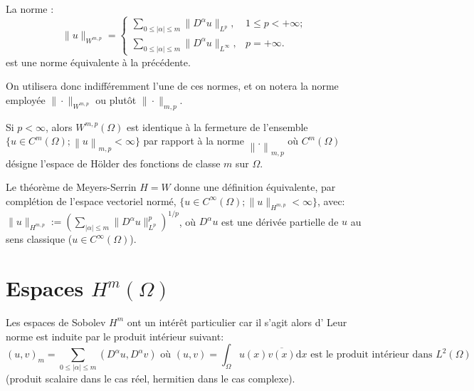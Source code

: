 \medskip
La norme :
\begin{equation}
\| u \|_{W^{m, p}} = \begin{cases} \sum\limits _{0\leqslant | \alpha | \leqslant m} \| D^{\alpha} u \|_{L^{p}}, & 1 \leqslant p < + \infty; \\ \sum\limits _{0 \leqslant | \alpha | \leqslant m} \| D^{\alpha} u \|_{L^{\infty}}, & p = + \infty. \end{cases} \end{equation}
est une norme équivalente à la précédente.

On utilisera donc indifféremment l'une de ces normes, et on notera la norme
employée $\|\cdot\|_{W^{m, p}}$ ou plutôt $\|\cdot\|_{m, p}$.


\medskip{}
Si $p<\infty$, alors $W^{m,p}(\Omega)$ est identique à la fermeture de l'ensemble
$\lbrace u \in C^m(\Omega) ; \left\|u \right\|_{m,p} < \infty \rbrace$ par rapport à la norme
$\left\| . \right\|_{m,p}$ où $C^m(\Omega)$ désigne l'espace de H\"older des fonctions de
classe $m$ sur $\Omega$.

\medskip
Le théorème de Meyers-Serrin $H=W$ donne une définition équivalente, par complétion de l'espace
vectoriel normé,
$
\{u\in C^\infty(\Omega);\| u \|_{H^{m, p}} < \infty\}
$,
avec:
$
\| u \|_{H^{m, p}} := \left( \sum_{| \alpha | \leqslant m} \| D^{\alpha} u \|_{L^{p}}^p \right)^{1/p}
$,
où $D^\alpha u$ est une dérivée partielle de $u$ au sens classique ($u \in C^\infty(\Omega)$).


\medskip
\section{Espaces $H^m(\Omega)$}

\begin{definition}
\end{definition}

\medskip
\begin{theoreme}
Les espaces de Sobolev $H^m$ ont un intérêt particulier car il s'agit alors d'
Leur norme est induite par le produit intérieur suivant:
\begin{equation}\left( u , v \right)_{m} =\sum \limits _{0 \leqslant \vert \alpha\vert\leqslant m} \left( D^{\alpha} u, D^{\alpha} v\right)
\text{ où } \left( u , v \right) = \int_{\Omega} u(x) \overline{v(x)} \mathrm dx \text{ est le produit intérieur dans } L^{2} \left( \Omega \right)
\end{equation}
(produit scalaire dans le cas réel, hermitien dans le cas complexe).
\end{theoreme}

